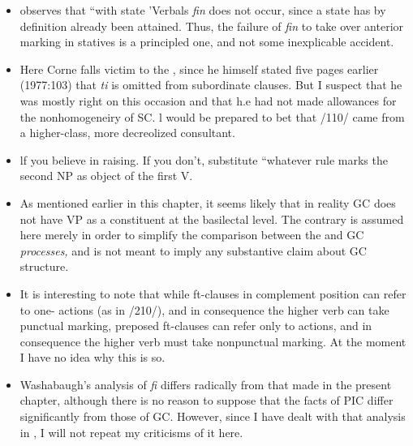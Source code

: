 \begin{itemize}
\begin{itemize}
\begin{itemize}
\begin{itemize}
\begin{itemize}
\begin{itemize}
\begin{itemize}
\item \citet{Corne1981} observes that ``with state 'Verbals \textit{fin} does not occur, since a state has by definition already been attained. Thus, the failure of \textit{fin} to take over anterior marking in statives is a principled one, and not some inexplicable accident.
\item Here Corne falls victim to the , since he himself stated five pages earlier (1977:103) that \textit{ti} is omitted from subordinate clauses. But I suspect that he was mostly right on this occasion and that h.e had not made allowances for the nonhomogeneiry of SC. l would be prepared to bet that /110/ came from a higher-class, more decreolized consultant.
\item lf you believe in raising. If you don't, substitute ``whatever rule marks the second NP as object of the first V.{\textquotedbl}
\item As mentioned earlier in this chapter, it seems likely that in reality GC does not have VP as a constituent at the basilectal level. The contrary is assumed here merely in order to simplify the com\-parison between the  and GC \textit{processes,} and is not meant to imply any substantive claim about GC structure.
\item It is interesting to note that while ft-clauses in complement position can refer to one- actions (as in /210/), and in consequence the higher verb can take punctual marking, preposed ft-clauses can refer only to  actions, and in consequence the higher verb must take nonpunctual marking. At the moment I have no idea why this is so.
\item Washabaugh's analysis of \textit{fi} differs radically from that made in the present chapter, although there is no reason to suppose that the facts of PIC differ significantly from those of GC. However, since I have dealt with that analysis in \citet{Bickerton1980}, I will not repeat my criticisms of it here.
\end{itemize}





\end{itemize}
\end{itemize}
\end{itemize}
\end{itemize}
\end{itemize}
\end{itemize}
